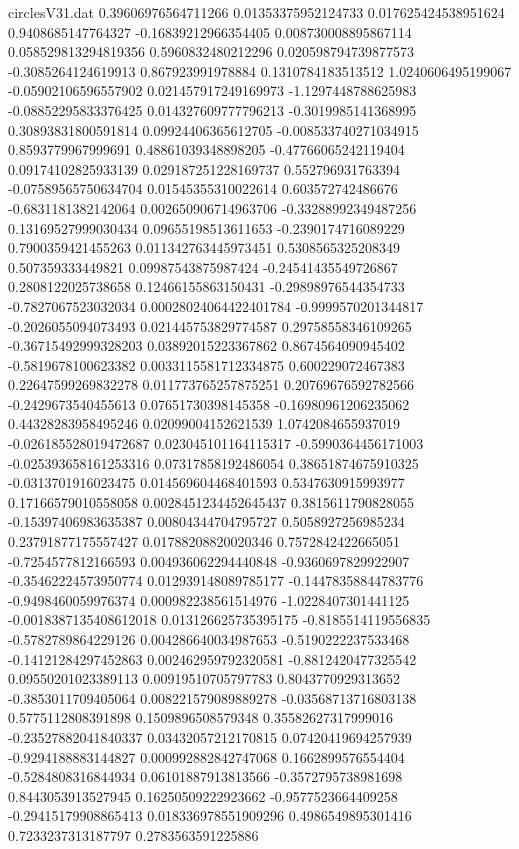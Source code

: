 \begin{filecontents}{circlesV31.dat}
0.39606976564711266	0.01353375952124733	0.017625424538951624
0.9408685147764327	-0.16839212966354405	0.008730008895867114
0.058529813294819356	0.5960832480212296	0.020598794739877573
-0.3085264124619913	0.867923991978884	0.1310784183513512
1.0240606495199067	-0.05902106596557902	0.021457917249169973
-1.1297448788625983	-0.08852295833376425	0.014327609777796213
-0.3019985141368995	0.30893831800591814	0.09924406365612705
-0.008533740271034915	0.8593779967999691	0.48861039348898205
-0.47766065242119404	0.09174102825933139	0.029187251228169737
0.552796931763394	-0.07589565750634704	0.01545355310022614
0.603572742486676	-0.6831181382142064	0.002650906714963706
-0.33288992349487256	0.13169527999030434	0.09655198513611653
-0.2390174716089229	0.7900359421455263	0.011342763445973451
0.5308565325208349	0.507359333449821	0.09987543875987424
-0.24541435549726867	0.2808122025738658	0.12466155863150431
-0.29898976544354733	-0.7827067523032034	0.00028024064422401784
-0.9999570201344817	-0.2026055094073493	0.021445753829774587
0.29758558346109265	-0.36715492999328203	0.03892015223367862
0.8674564090945402	-0.5819678100623382	0.0033115581712334875
0.600229072467383	0.22647599269832278	0.011773765257875251
0.20769676592782566	-0.2429673540455613	0.07651730398145358
-0.16980961206235062	0.44328283958495246	0.02099004152621539
1.0742084655937019	-0.026185528019472687	0.023045101164115317
-0.5990364456171003	-0.025393658161253316	0.07317858192486054
0.38651874675910325	-0.0313701916023475	0.014569604468401593
0.5347630915993977	0.17166579010558058	0.0028451234452645437
0.3815611790828055	-0.15397406983635387	0.00804344704795727
0.5058927256985234	0.23791877175557427	0.01788208820020346
0.7572842422665051	-0.7254577812166593	0.004936062294440848
-0.9360697829922907	-0.35462224573950774	0.012939148089785177
-0.14478358844783776	-0.9498460059976374	0.000982238561514976
-1.0228407301441125	-0.0018387135408612018	0.013126625735395175
-0.8185514119556835	-0.5782789864229126	0.004286640034987653
-0.5190222237533468	-0.14121284297452863	0.002462959792320581
-0.8812420477325542	0.09550201023389113	0.00919510705797783
0.8043770929313652	-0.3853011709405064	0.008221579089889278
-0.03568713716803138	0.5775112808391898	0.1509896508579348
0.35582627317999016	-0.23527882041840337	0.03432057212170815
0.07420419694257939	-0.9294188883144827	0.000992882842747068
0.1662899576554404	-0.5284808316844934	0.06101887913813566
-0.3572795738981698	0.8443053913527945	0.16250509222923662
-0.9577523664409258	-0.29415179908865413	0.018336978551909296
0.4986549895301416	0.7233237313187797	0.2783563591225886

\end{filecontents}
